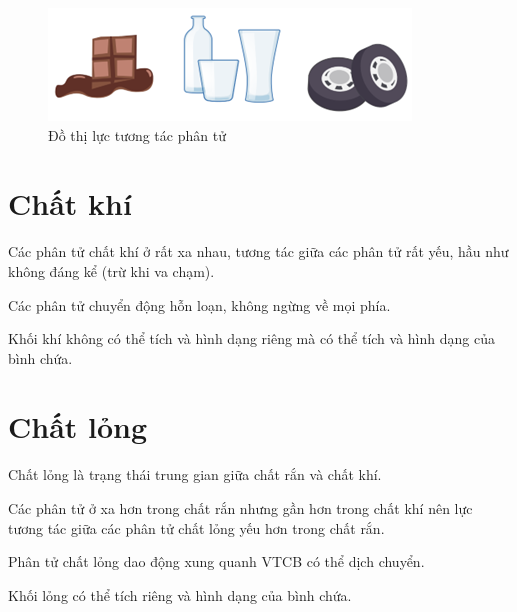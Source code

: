 \documentclass[a4paper, 12pt]{article}
\begin{document}
\begin{figure}[H]
	\centering
	\includegraphics[width=0.5\linewidth]{img/Picture6.png}
	\caption{Đồ thị lực tương tác phân tử}
\end{figure}

\section{Chất khí}
\raisebox{0.3ex}{\tiny$\bullet$} Các phân tử chất khí ở rất xa nhau, tương tác giữa các phân tử rất yếu, hầu như không đáng kể (trừ khi va chạm).

\raisebox{0.3ex}{\tiny$\bullet$} Các phân tử chuyển động hỗn loạn, không ngừng về mọi phía.

\raisebox{0.3ex}{\tiny$\bullet$} Khối khí không có thể tích và hình dạng riêng mà có thể tích và hình dạng của bình chứa.

\section{Chất lỏng}
Chất lỏng là trạng thái trung gian giữa chất rắn và chất khí.

\raisebox{0.3ex}{\tiny$\bullet$} Các phân tử ở xa hơn trong chất rắn nhưng gần hơn trong chất khí nên lực tương tác giữa các phân tử chất lỏng yếu hơn trong chất rắn.

\raisebox{0.3ex}{\tiny$\bullet$} Phân tử chất lỏng dao động xung quanh VTCB có thể dịch chuyển.

\raisebox{0.3ex}{\tiny$\bullet$} Khối lỏng có thể tích riêng và hình dạng của bình chứa.
\end{document}
